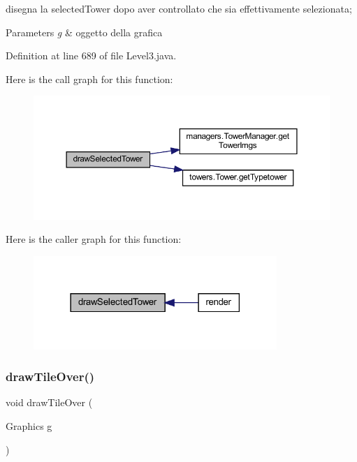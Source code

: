 disegna la selected\+Tower dopo aver controllato che sia effettivamente selezionata; 


\begin{DoxyParams}{Parameters}
{\em g} & oggetto della grafica \\
\hline
\end{DoxyParams}


Definition at line 689 of file Level3.\+java.

Here is the call graph for this function\+:
\nopagebreak
\begin{figure}[H]
\begin{center}
\leavevmode
\includegraphics[width=350pt]{classscenes_1_1_level3_a0a97d0bb6d32640b2ae351707946abf7_cgraph}
\end{center}
\end{figure}
Here is the caller graph for this function\+:\nopagebreak
\begin{figure}[H]
\begin{center}
\leavevmode
\includegraphics[width=261pt]{classscenes_1_1_level3_a0a97d0bb6d32640b2ae351707946abf7_icgraph}
\end{center}
\end{figure}
\mbox{\label{classscenes_1_1_level3_ac299bbbbb70f97ae032c1345d5937378}} 
\subsubsection{\texorpdfstring{draw\+Tile\+Over()}{drawTileOver()}}
{\footnotesize\ttfamily void draw\+Tile\+Over (\begin{DoxyParamCaption}\item[{Graphics}]{g }\end{DoxyParamCaption})\hspace{0.3cm}{\ttfamily [private]}}




